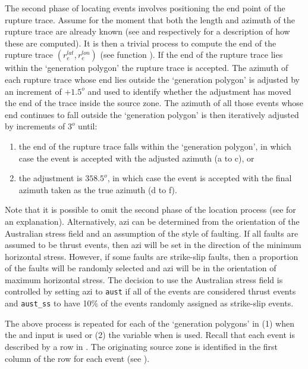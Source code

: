 The second phase of locating events involves positioning the end
point of the rupture trace. Assume for the moment that both the
length and azimuth of the rupture trace are already known (see
 and  respectively
for a description of how these are computed). It is then a trivial
process to compute the end of the rupture trace
$(r_e^{lat},r_e^{lon})$ (see function ). If
the end of the rupture trace lies within the `generation
polygon' the rupture trace is accepted.
The azimuth of each rupture trace whose end lies outside the
`generation polygon' is adjusted by an
increment of $+1.5^o$ and  used to
identify whether the adjustment has moved the end of the trace
inside the source zone. The azimuth of all those events whose end
continues to fall outside the `generation
polygon' is then iteratively adjusted by
increments of $3^o$ until:
\begin{enumerate}
\item the end of the rupture trace falls within the `generation
polygon', in which case the event is
accepted with the adjusted azimuth (a
to c), or \item the adjustment is $358.5^o$, in which case the
event is accepted with the final azimuth taken as the true azimuth
(d to f).
\end{enumerate}
Note that it is possible to omit the second phase of the location
process (see  for an explanation).
Alternatively, azi can be determined from the orientation of the
Australian stress field and an assumption of the style of
faulting.  If all faults are assumed to be thrust events, then azi
will be set in the direction of the minimum horizontal stress.
However, if some faults are strike-slip faults, then a proportion
of the faults will be randomly selected and azi will be in the
orientation of maximum horizontal stress.  The decision to use the
Australian stress field is controlled by setting azi to
\texttt{aust} if all of the events are considered thrust events
and \texttt{aust\_ss} to have 10\% of the events randomly assigned
as strike-slip events.


The above process is repeated for each of the `generation
polygons' in (1)
 when the
 and
 input is
used or (2) the variable  when
 is used. Recall
that each event is described by a row in . The
originating source zone is identified in the first column of the
row for each event (see ).

